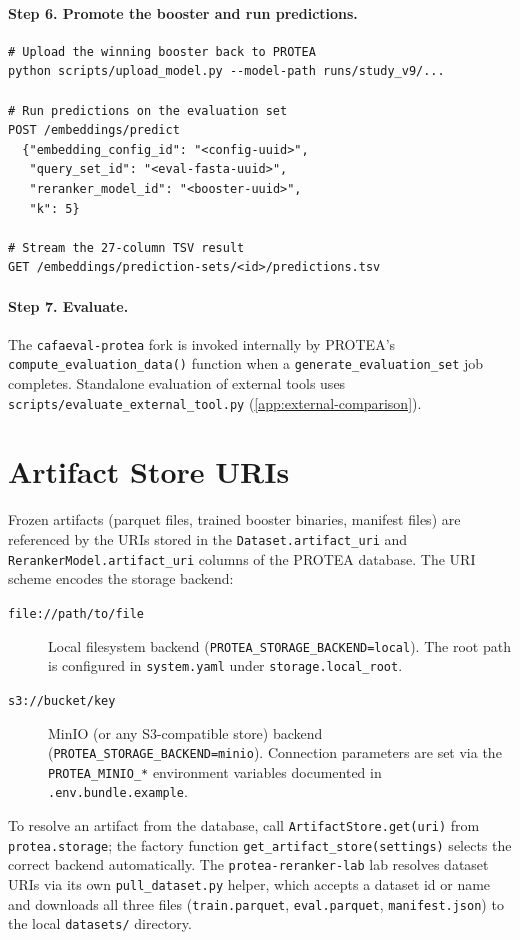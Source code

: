\paragraph{Step 6. Promote the booster and run predictions.}
\begin{verbatim}
# Upload the winning booster back to PROTEA
python scripts/upload_model.py --model-path runs/study_v9/...

# Run predictions on the evaluation set
POST /embeddings/predict
  {"embedding_config_id": "<config-uuid>",
   "query_set_id": "<eval-fasta-uuid>",
   "reranker_model_id": "<booster-uuid>",
   "k": 5}

# Stream the 27-column TSV result
GET /embeddings/prediction-sets/<id>/predictions.tsv
\end{verbatim}

\paragraph{Step 7. Evaluate.}
The \texttt{cafaeval-protea} fork is invoked internally by
PROTEA's \texttt{compute\_evaluation\_data()} function when a
\texttt{generate\_evaluation\_set} job completes. Standalone
evaluation of external tools uses \texttt{scripts/evaluate\_external\_tool.py}
(\cref{app:external-comparison}).

\section{Artifact Store URIs}
\label{app:repro-artifacts}

Frozen artifacts (parquet files, trained booster binaries, manifest
files) are referenced by the URIs stored in the \texttt{Dataset.artifact\_uri}
and \texttt{RerankerModel.artifact\_uri} columns of the PROTEA database.
The URI scheme encodes the storage backend:

\begin{description}
  \item[\texttt{file://path/to/file}] Local filesystem backend
    (\texttt{PROTEA\_STORAGE\_BACKEND=local}). The root path is
    configured in \texttt{system.yaml} under \texttt{storage.local\_root}.
  \item[\texttt{s3://bucket/key}] MinIO (or any S3-compatible store)
    backend (\texttt{PROTEA\_STORAGE\_BACKEND=minio}). Connection
    parameters are set via the \texttt{PROTEA\_MINIO\_*} environment
    variables documented in \texttt{.env.bundle.example}.
\end{description}

To resolve an artifact from the database, call
\texttt{ArtifactStore.get(uri)} from \texttt{protea.storage}; the
factory function \texttt{get\_artifact\_store(settings)} selects the
correct backend automatically. The \texttt{protea-reranker-lab} lab
resolves dataset URIs via its own \texttt{pull\_dataset.py} helper,
which accepts a dataset id or name and downloads all three files
(\texttt{train.parquet}, \texttt{eval.parquet}, \texttt{manifest.json})
to the local \texttt{datasets/} directory.
